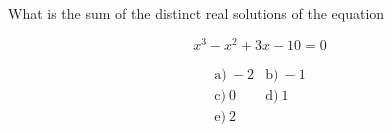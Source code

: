 What is the sum of the distinct real solutions of the equation



\[
x^3-x^2+3x-10=0
\]

\[
\begin{array}{ll}
\text{a)}\ -2 & \text{b)}\ -1 \\
\text{c)}\ 0 & \text{d)}\ 1 \\
\text{e)}\ 2
\end{array}
\]

